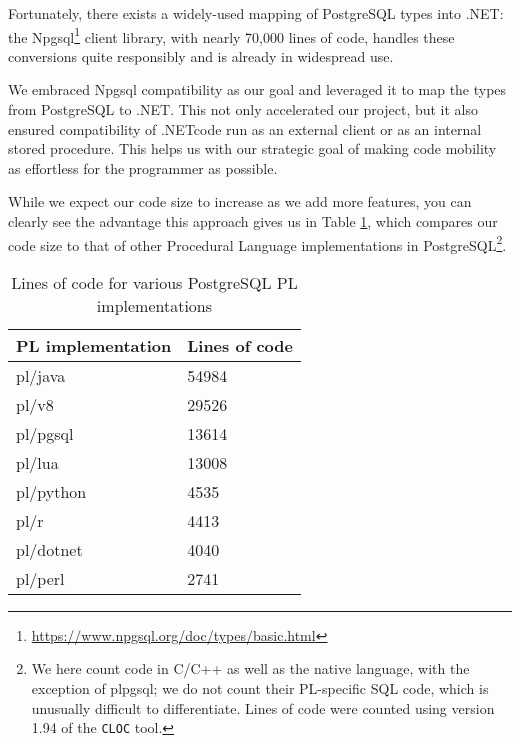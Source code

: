 \documentclass[sigconf,techreport,authorversion,nonacm]{acmart}
\newcommand{\dotnet}{.NET}
\begin{document}
Fortunately, there exists a widely-used mapping of PostgreSQL types
into \dotnet: the Npgsql\footnote{\url{https://www.npgsql.org/doc/types/basic.html}}
client library, with nearly 70,000 lines of code, handles these
conversions quite responsibly and is already in widespread use.

We embraced Npgsql compatibility as our goal and leveraged it to
map the types from PostgreSQL to \dotnet. This not only accelerated
our project, but it also ensured compatibility of \dotnet code
run as an external client or as an internal stored procedure.
This helps us with our strategic goal of making code mobility as
effortless for the programmer as possible.

While we expect our code size to increase as we add more features,
you can clearly see the advantage this approach gives us in Table
\ref{table:LOC}, which compares our code size to that of other
Procedural Language implementations in PostgreSQL\footnote{We here
count code in C/C++ as well as the native language, with the exception
of pl\/pgsql; we do not count their PL-specific SQL code, which is
unusually difficult to differentiate.  Lines of code were counted
using version 1.94 of the \texttt{CLOC} tool.}.

\begin{table}[!htbp]
    \caption{Lines of code for various PostgreSQL PL implementations}
        \label{table:LOC}
        \begin{tabular}{l | l}
                \toprule
                \rowcolor{gray!25} \textbf{PL implementation} & \textbf{Lines of code} \\ \midrule
                pl/java                                       & 54984                  \\
                pl/v8                                         & 29526                  \\
                pl/pgsql                                      & 13614                  \\
                pl/lua                                        & 13008                  \\
                pl/python                                     & 4535                   \\
                pl/r                                          & 4413                   \\
                pl/dotnet                                     & 4040                   \\
                pl/perl                                       & 2741                   \\ \bottomrule
        \end{tabular}
\end{table}
\end{document}
